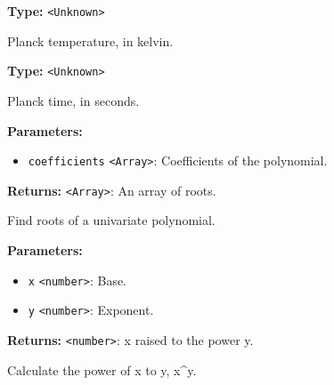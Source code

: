 \documentclass[12pt,a4paper]{article}
\begin{document}
\vspace{5mm}
\noindent {}\vspace{4mm}


\noindent \textbf{Type:} \texttt{<Unknown>}

\noindent Planck temperature, in kelvin.

\vspace{5mm}
\noindent {}\vspace{4mm}


\noindent \textbf{Type:} \texttt{<Unknown>}

\noindent Planck time, in seconds.

\vspace{5mm}
\noindent {}


\noindent \textbf{Parameters:}
\begin{itemize}
  \item \texttt{coefficients} \texttt{<Array>}: Coefficients of the polynomial.
\end{itemize}

\noindent \textbf{Returns:} \texttt{<Array>}: An array of roots.

\noindent Find roots of a univariate polynomial.

\vspace{5mm}
\noindent {}


\noindent \textbf{Parameters:}
\begin{itemize}
  \item \texttt{x} \texttt{<number>}: Base.
  \item \texttt{y} \texttt{<number>}: Exponent.
\end{itemize}

\noindent \textbf{Returns:} \texttt{<number>}: x raised to the power y.

\noindent Calculate the power of x to y, x\textasciicircum{}y.

\vspace{5mm}
\noindent {}
\end{document}
